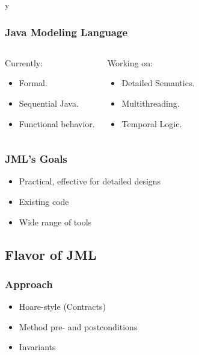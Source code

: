 \if y\MAKEHANDOUTS \documentclass[compress,landscape,handout]{beamer}
\begin{document}
\begin{frame}
\frametitle{Java Modeling Language}
\begin{columns}[t]
\begin{block}{Currently:}
\begin{itemize}
\item
Formal.

\item 
Sequential Java.

\item
Functional behavior.
\end{itemize}
\end{block}

\pause

\begin{block}{Working on:}
\begin{itemize}
\item
Detailed Semantics.

\item 
Multithreading.

\item
Temporal Logic.
\end{itemize}
\end{block}
\end{columns}
\end{frame}

\begin{frame}
\frametitle{JML's Goals}
\begin{itemize}
\item
Practical, effective for detailed designs

\item
Existing code

\item
Wide range of tools
\end{itemize}
\end{frame}

\subsection[Flavor]{Flavor of JML}

\begin{frame}
\frametitle{Approach}
\begin{itemize}
\item
Hoare-style (Contracts)

\item
Method pre- and postconditions 

\item
Invariants
\end{itemize}
\end{frame}
\end{document}
